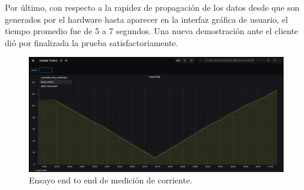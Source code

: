 Por \'{u}ltimo, con respecto a la rapidez de propagaci\'{o}n de los datos desde que son generados por el hardware hasta aparecer en la interfaz gráfica de usuario, el tiempo promedio fue de 5 a 7 segundos. Una nueva demostraci\'{o}n ante el cliente di\'{o} por finalizada la prueba satisfactoriamente.
\vspace{200px}
\begin{figure}[h!]
	\centering
	\includegraphics[width=1.0\linewidth]{Figures/captura_historico_dropdown}
	\caption{Ensayo end to end de medici\'{o}n de corriente.}
	\label{fig:capturahistoricodropdown}
\end{figure}\\